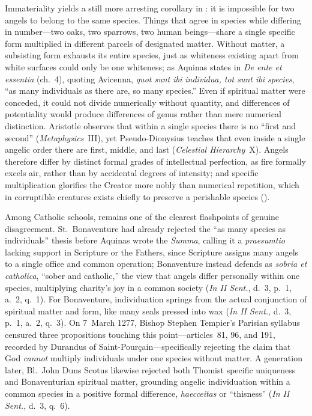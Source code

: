 Immateriality yields a still more arresting corollary in : it is impossible for two angels to belong to the same species. Things that agree in species while differing in number---two oaks, two sparrows, two human beings---share a single specific form multiplied in different parcels of designated matter. Without matter, a subsisting form exhausts its entire species, just as whiteness existing apart from white surfaces could only be one whiteness; as Aquinas states in \emph{De ente et essentia} (ch.~4), quoting Avicenna, \emph{quot sunt ibi individua, tot sunt ibi species}, ``as many individuals as there are, so many species.'' Even if spiritual matter were conceded, it could not divide numerically without quantity, and differences of potentiality would produce differences of genus rather than mere numerical distinction. Aristotle observes that within a single species there is no ``first and second'' (\emph{Metaphysics}~III), yet Pseudo-Dionysius teaches that even inside a single angelic order there are first, middle, and last (\emph{Celestial Hierarchy}~X). Angels therefore differ by distinct formal grades of intellectual perfection, as fire formally excels air, rather than by accidental degrees of intensity; and specific multiplication glorifies the Creator more nobly than numerical repetition, which in corruptible creatures exists chiefly to preserve a perishable species ().

Among Catholic schools,  remains one of the clearest flashpoints of genuine disagreement. St.~Bonaventure had already rejected the ``as many species as individuals'' thesis before Aquinas wrote the \emph{Summa}, calling it a \emph{praesumtio} lacking support in Scripture or the Fathers, since Scripture assigns many angels to a single office and common operation; Bonaventure instead defends as \emph{sobria et catholica}, ``sober and catholic,'' the view that angels differ personally within one species, multiplying charity's joy in a common society (\emph{In II Sent.}, d.~3, p.~1, a.~2, q.~1). For Bonaventure, individuation springs from the actual conjunction of spiritual matter and form, like many seals pressed into wax (\emph{In II Sent.}, d.~3, p.~1, a.~2, q.~3). On 7~March 1277, Bishop Stephen Tempier's Parisian syllabus censured three propositions touching this point---articles~81, 96, and 191, recorded by Durandus of Saint-Pour\c{c}ain---specifically rejecting the claim that God \emph{cannot} multiply individuals under one species without matter. A generation later, Bl.~John Duns Scotus likewise rejected both Thomist specific uniqueness and Bonaventurian spiritual matter, grounding angelic individuation within a common species in a positive formal difference, \emph{haecceitas} or ``thisness'' (\emph{In II Sent.}, d.~3, q.~6).

